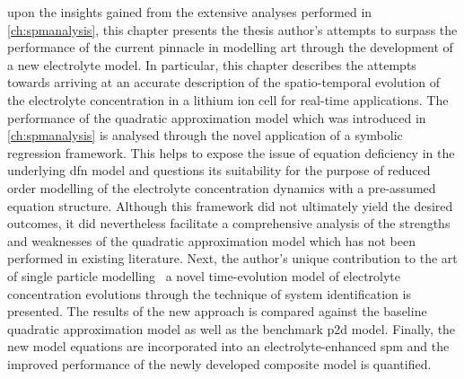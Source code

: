 
  upon  the insights  gained  from  the extensive  analyses
performed in  \cref{ch:spmanalysis}, this  chapter presents the  thesis author's
attempts to  surpass the performance  of the  current pinnacle in  modelling art
through the development of a new  electrolyte model. In particular, this chapter
describes  the attempts  towards  arriving  at an  accurate  description of  the
spatio-temporal  evolution of  the electrolyte  concentration in  a lithium  ion
cell for real-time applications. The performance of the  quadratic approximation
model which was introduced in \cref{ch:spmanalysis} is analysed through the
novel application of a symbolic regression framework. This  helps to expose the
issue of  equation deficiency in the underlying \gls{dfn} model and questions
its suitability for the purpose of reduced  order  modelling  of  the
electrolyte  concentration  dynamics  with  a pre-assumed equation structure.
Although this framework did not ultimately yield the desired outcomes, it did
nevertheless facilitate a comprehensive analysis of the  strengths  and
weaknesses  of  the  quadratic  approximation  model  which has  not  been
performed  in  existing  literature.  Next, the  author's  unique contribution
to the art of single particle modelling \viz~a novel time-evolution model of
electrolyte concentration evolutions  through the technique  of system
identification  is  presented. The  results  of  the  new approach  is  compared
against  the baseline  quadratic approximation  model as  well as  the benchmark
\gls{p2d}  model. Finally,  the new  model  equations are  incorporated into  an
electrolyte-enhanced  \gls{spm}  and  the  improved  performance  of  the  newly
developed composite model is quantified.

